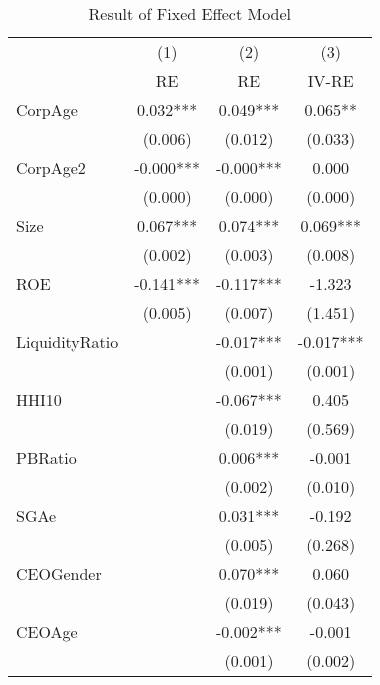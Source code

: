 \begin{table}[htbp]\centering
\def\sym#1{\ifmmode^{#1}\else\(^{#1}\)\fi}
\caption{Result of Fixed Effect Model \label{tab:regressionFE}}
\begin{tabular}{l*{3}{c}}
\hline\hline
            &\multicolumn{1}{c}{(1)}&\multicolumn{1}{c}{(2)}&\multicolumn{1}{c}{(3)}\\
            &\multicolumn{1}{c}{RE}&\multicolumn{1}{c}{RE}&\multicolumn{1}{c}{IV-RE}\\
\hline
CorpAge     &       0.032***&       0.049***&       0.065** \\
            &     (0.006)   &     (0.012)   &     (0.033)   \\
[1em]
CorpAge2    &      -0.000***&      -0.000***&       0.000   \\
            &     (0.000)   &     (0.000)   &     (0.000)   \\
[1em]
Size        &       0.067***&       0.074***&       0.069***\\
            &     (0.002)   &     (0.003)   &     (0.008)   \\
[1em]
ROE         &      -0.141***&      -0.117***&      -1.323   \\
            &     (0.005)   &     (0.007)   &     (1.451)   \\
[1em]
LiquidityRatio&               &      -0.017***&      -0.017***\\
            &               &     (0.001)   &     (0.001)   \\
[1em]
HHI10       &               &      -0.067***&       0.405   \\
            &               &     (0.019)   &     (0.569)   \\
[1em]
PBRatio     &               &       0.006***&      -0.001   \\
            &               &     (0.002)   &     (0.010)   \\
[1em]
SGAe        &               &       0.031***&      -0.192   \\
            &               &     (0.005)   &     (0.268)   \\
[1em]
CEOGender   &               &       0.070***&       0.060   \\
            &               &     (0.019)   &     (0.043)   \\
[1em]
CEOAge      &               &      -0.002***&      -0.001   \\
            &               &     (0.001)   &     (0.002)   \\

\end{tabular}
\end{table}
